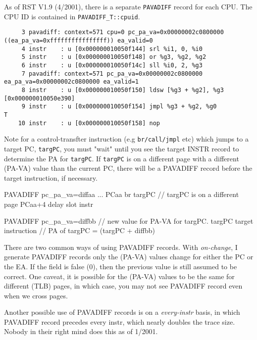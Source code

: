 \documentclass[10pt]{article}
\begin{document}
As of RST V1.9 (4/2001), there is a separate \texttt{PAVADIFF} record
for each CPU.  The CPU ID is contained in \texttt{PAVADIFF\_T::cpuid}.

{\footnotesize
\begin{verbatim}
     3 pavadiff: context=571 cpu=0 pc_pa_va=0x00000002c0800000 ((ea_pa_va=0xffffffffffffffff)) ea_valid=0
     4 instr    : u [0x000000010050f144] srl %i1, 0, %i0                   
     5 instr    : u [0x000000010050f148] or %g3, %g2, %g2                  
     6 instr    : u [0x000000010050f14c] sll %i0, 2, %g3                   
     7 pavadiff: context=571 pc_pa_va=0x00000002c0800000 ea_pa_va=0x00000002c0800000 ea_valid=1
     8 instr    : u [0x000000010050f150] ldsw [%g3 + %g2], %g3             [0x000000010050e390] 
     9 instr    : u [0x000000010050f154] jmpl %g3 + %g2, %g0             T 
    10 instr    : u [0x000000010050f158] nop                               
\end{verbatim}
}

Note for a control-transfter instruction (e.g \texttt{br/call/jmpl} etc)
which jumps to a target PC, \texttt{targPC}, you must "wait" until you
see the target INSTR record to determine the PA for \texttt{targPC}.  If
\texttt{targPC} is on a different page with a different (PA-VA) value
than the current PC, there will be a PAVADIFF record before the target
instruction, if necessary.

\begin{rqcode}{ }
  PAVADIFF pc\_pa\_va=diffaa
  ...
  PCaa     br targPC		// targPC is on a different page
  PCaa+4   delay slot instr

  PAVADIFF pc\_pa\_va=diffbb	// new value for PA-VA for targPC.
  targPC   target instruction   // PA of targPC = (targPC + diffbb)
\end{rqcode}

There are two common ways of using PAVADIFF records.  With
\textsl{on-change}, I generate PAVADIFF records only the (PA-VA) values
change for either the PC or the EA.  If the  field is
false (0), then the previous  value is still assumed
to be correct.  One caveat, it is possible for the (PA-VA) values to be the same for
different (TLB) pages, in which case, you may not see PAVADIFF record
even when we cross pages.

Another possible use of PAVADIFF records is on a \textsl{every-instr}
basis, in which PAVADIFF record precedes every instr, which nearly
doubles the trace size.  Nobody in their right mind does this as of
1/2001.
\end{document}
